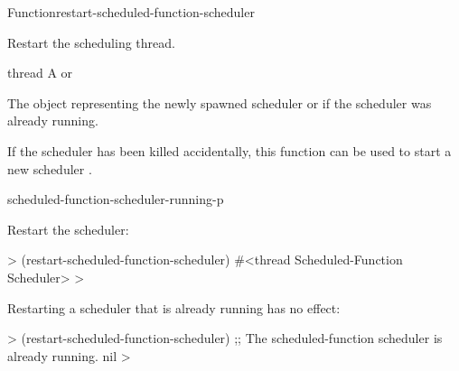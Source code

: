 \documentclass[10pt,twoside,english,pdftex]{article}
\begin{document}
\begin{functiondoc}{Function}{restart-scheduled-function-scheduler}%
  {\noargs{} 
    }
%

\fnsyntax

\fnpurpose Restart the  scheduling thread.

\fnpackage {}

\fnmodule {}

\fnargs
\begin{args}{thread}
\arg[thread] A  or \nil{}
\end{args}

\fnreturns The object representing the newly spawned
 scheduler  or \nil{} if the
 scheduler was already running.

\fnerrors
\nothreads{}

\fndescription If the  scheduler  has
been killed accidentally, this function can be used to start a new scheduler
.

\begin{alsos}{scheduled-function-scheduler-running-p}
\end{alsos}

\fnexamples
Restart the  scheduler:
%
\W\supp
\begin{example}
  > (restart-scheduled-function-scheduler)
  #<thread Scheduled-Function Scheduler>
  >
\end{example}
%
Restarting a  scheduler that is already running has
no effect:
%
\W\supp\notpretop
\begin{example}
  > (restart-scheduled-function-scheduler)
  ;; The scheduled-function scheduler is already running.
  nil
  >
\end{example}

\end{functiondoc}

\end{document}
